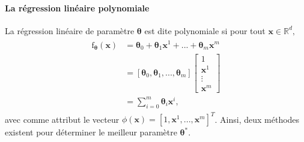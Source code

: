 \documentclass[letterpaper,11pt,english]{sphinxmanual}
\begin{document}
\paragraph{La régression linéaire polynomiale}
\label{\detokenize{chapter3:la-regression-lineaire-polynomiale}}
\sphinxAtStartPar
La régression linéaire de paramètre \(\boldsymbol{\theta}\) est dite
polynomiale si pour tout \(\mathbf{x} \in \mathbb{R}^d,\)
\begin{equation}\label{equation:chapter3:chapter3:15}
\begin{split}\begin{aligned}
\text{f}_{\boldsymbol{\theta}}(\mathbf{x}) &= \boldsymbol{\theta}_0 + \boldsymbol{\theta}_1 \mathbf{x}^1 +...+ \boldsymbol{\theta}_m \mathbf{x}^{m}
\\
&= \left[ \boldsymbol{\theta}_0, \boldsymbol{\theta}_1, ..., \boldsymbol{\theta}_m\right] \begin{bmatrix}
1 \\
\mathbf{x}^{1} \\
\vdots \\
\mathbf{x}^{m}
\end{bmatrix}
\\
&=\sum_{i=0}^{m} \boldsymbol{\theta}_i \mathbf{x}^{i},\end{aligned}\end{split}
\end{equation}
\sphinxAtStartPar
avec comme attribut le vecteur
\(\phi (\mathbf{x}) = \left[ 1, \mathbf{x}^1, ..., \mathbf{x}^m\right]^T\).
Ainsi, deux méthodes existent pour déterminer le meilleur paramètre
\(\boldsymbol{\theta}^*\).
\end{document}
